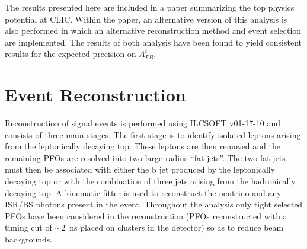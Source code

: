 The results presented here are included in a paper summarizing the top physics potential at \ac{CLIC}\cite{TopPaperDraft}. Within the paper, an alternative version of this analysis is also performed in which an alternative reconstruction method and event selection are implemented. The results of both analysis have been found to yield consistent results for the expected precision on $A_{FB}^{t}$.


\section{Event Reconstruction}
Reconstruction of signal events is performed using ILCSOFT v01-17-10 and consists of three main stages. The first stage is to identify isolated leptons arising from the leptonically decaying top. These leptons are then removed and the remaining PFOs are resolved into two large radius ``fat jets''. The two fat jets must then be associated with either the b jet produced by the leptonically decaying top or with the combination of three jets arising from the hadronically decaying top. A kinematic fitter is used to reconstruct the neutrino and any \ac{ISR}/\ac{BS} photons present in the event. Throughout the analysis only tight selected PFOs have been considered in the reconstruction (PFOs reconstructed with a timing cut of $\sim$2~ns placed on clusters in the detector\cite{cdrvol2}) so as to reduce beam backgrounds.

